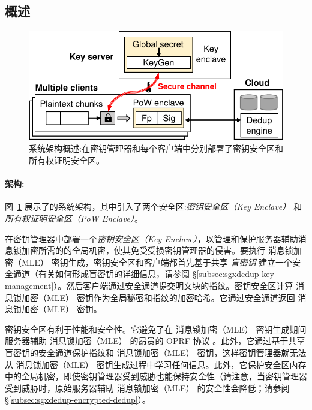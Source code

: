 \subsection{概述}
\label{subsec:sgxdedup-arch}

\begin{figure}[t]
\centering
\includegraphics[width=\textwidth]{pic/sgxdedup/overview.pdf}
\caption{\sysnameS 系统架构概述:\sysnameS 在密钥管理器和每个客户端中分别部署了密钥安全区和所有权证明安全区。}
\label{fig:sgxdedup-overview}
\vspace{-3pt}
\end{figure}

\paragraph*{架构:} 图~\ref{fig:sgxdedup-overview} 展示了\sysnameS 的系统架构，其中引入了两个安全区:\textit{密钥安全区（Key Enclave）} 和 \textit{所有权证明安全区（PoW Enclave）}。 

\sysnameS 在密钥管理器中部署一个\textit{密钥安全区（Key Enclave）}，以管理和保护服务器辅助消息锁加密所需的的全局机密，使其免受受损密钥管理器的侵害。要执行 消息锁加密（MLE） 密钥生成，密钥安全区和客户端都首先基于共享 \textit{盲密钥} 建立一个安全通道（有关如何形成盲密钥的详细信息，请参阅 \S\ref{subsec:sgxdedup-key-management}）。然后客户端通过安全通道提交明文块的指纹。密钥安全区计算 消息锁加密（MLE） 密钥作为全局秘密和指纹的加密哈希。它通过安全通道返回 消息锁加密（MLE） 密钥。

密钥安全区有利于性能和安全性。它避免了在 消息锁加密（MLE） 密钥生成期间服务器辅助 消息锁加密（MLE） 的昂贵的 OPRF 协议 \cite{bellare13b}。此外，它通过基于共享盲密钥的安全通道保护指纹和 消息锁加密（MLE） 密钥，这样密钥管理器就无法从 消息锁加密（MLE） 密钥生成过程中学习任何信息。此外，它保护安全区内存中的全局机密，即使密钥管理器受到威胁也能保持安全性（请注意，当密钥管理器受到威胁时，原始服务器辅助 消息锁加密（MLE） 的安全性会降低；请参阅 \S\ref{subsec:sgxdedup-encrypted-dedup}）。

